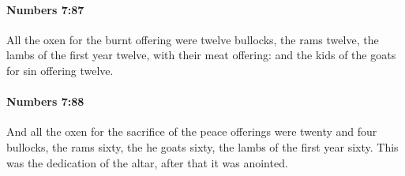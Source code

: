 		\paragraph{Numbers 7:87} %
			\label{NUMBERS-7-87}

			All the oxen for the burnt offering were twelve bullocks, the rams twelve, the lambs of the first year twelve, with their meat offering: and the kids of the goats for sin offering twelve.


		\paragraph{Numbers 7:88} %
			\label{NUMBERS-7-88}

			And all the oxen for the sacrifice of the peace offerings were twenty and four bullocks, the rams sixty, the he goats sixty, the lambs of the first year sixty. This was the dedication of the altar, after that it was anointed.

